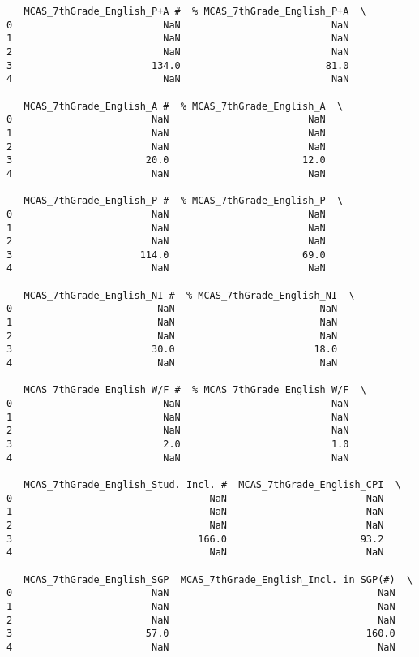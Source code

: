 \documentclass[11pt]{article}
\begin{document}
\begin{verbatim}
   MCAS_7thGrade_English_P+A #  % MCAS_7thGrade_English_P+A  \
0                          NaN                          NaN   
1                          NaN                          NaN   
2                          NaN                          NaN   
3                        134.0                         81.0   
4                          NaN                          NaN   

   MCAS_7thGrade_English_A #  % MCAS_7thGrade_English_A  \
0                        NaN                        NaN   
1                        NaN                        NaN   
2                        NaN                        NaN   
3                       20.0                       12.0   
4                        NaN                        NaN   

   MCAS_7thGrade_English_P #  % MCAS_7thGrade_English_P  \
0                        NaN                        NaN   
1                        NaN                        NaN   
2                        NaN                        NaN   
3                      114.0                       69.0   
4                        NaN                        NaN   

   MCAS_7thGrade_English_NI #  % MCAS_7thGrade_English_NI  \
0                         NaN                         NaN   
1                         NaN                         NaN   
2                         NaN                         NaN   
3                        30.0                        18.0   
4                         NaN                         NaN   

   MCAS_7thGrade_English_W/F #  % MCAS_7thGrade_English_W/F  \
0                          NaN                          NaN   
1                          NaN                          NaN   
2                          NaN                          NaN   
3                          2.0                          1.0   
4                          NaN                          NaN   

   MCAS_7thGrade_English_Stud. Incl. #  MCAS_7thGrade_English_CPI  \
0                                  NaN                        NaN   
1                                  NaN                        NaN   
2                                  NaN                        NaN   
3                                166.0                       93.2   
4                                  NaN                        NaN   

   MCAS_7thGrade_English_SGP  MCAS_7thGrade_English_Incl. in SGP(#)  \
0                        NaN                                    NaN   
1                        NaN                                    NaN   
2                        NaN                                    NaN   
3                       57.0                                  160.0   
4                        NaN                                    NaN   


\end{verbatim}
\end{document}
